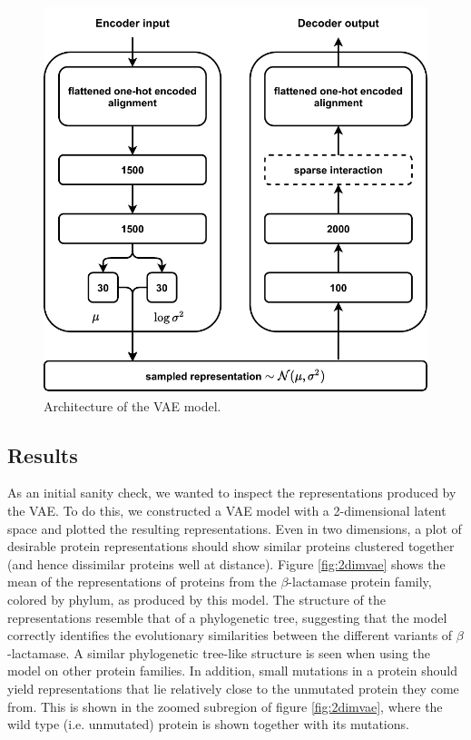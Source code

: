 \begin{figure}[H]
    \centering
    \includegraphics{report/figures/VAE_architecture2.pdf}
    \caption{Architecture of the VAE model.}
    \label{fig:vae_architecture}
\end{figure}

\subsection{Results}
As an initial sanity check, we wanted to inspect the representations produced by the VAE. To do this, we constructed a VAE model with a 2-dimensional latent space and plotted the resulting representations. Even in two dimensions, a plot of desirable protein representations should show similar proteins clustered together (and hence dissimilar proteins well at distance). Figure \ref{fig:2dimvae} shows the mean of the representations of proteins from the $\beta$-lactamase protein family, colored by phylum, as produced by this model. The structure of the representations resemble that of a phylogenetic tree, suggesting that the model correctly identifies the evolutionary similarities between the different variants of $\beta$-lactamase. A similar phylogenetic tree-like structure is seen when using the model on other protein families. In addition, small mutations in a protein should yield representations that lie relatively close to the unmutated protein they come from. This is shown in the zoomed subregion of figure \ref{fig:2dimvae}, where the wild type (i.e. unmutated) protein is shown together with its mutations. 

